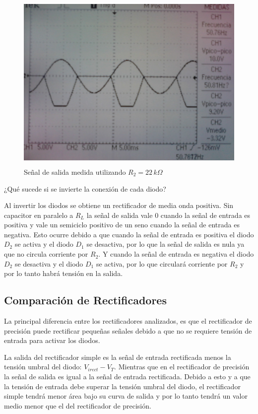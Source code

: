 \documentclass[10pt,spanish,a4paper,openany,notitlepage]{article}
\begin{document}
\begin{figure}[H]
\centering
\includegraphics[width=350pt, height=250pt]{mediciones/F4-22k.jpg}
\caption{Señal de salida medida utilizando $R_2 = 22\,\unit{k\Omega}$}
\label{fig:F4_22k}
\end{figure}


{\color{Orange} ¿Qué sucede si se invierte la conexión de cada diodo?}

Al invertir los diodos se obtiene un rectificador de media onda positiva. Sin capacitor en paralelo a
$R_L$ la señal de salida vale 0 cuando la señal de entrada es positiva y vale un semiciclo positivo de un seno cuando la señal de entrada es negativa. Esto ocurre debido a que cuando la señal de entrada es positiva el diodo $D_2$ se activa y el diodo $D_1$ se desactiva, por lo que la señal de salida es nula ya
que no circula corriente por $R_2$. Y cuando la señal de entrada es negativa el diodo $D_2$ se desactiva y el diodo $D_1$ se activa, por lo que circulará corriente por $R_2$ y por lo tanto habrá tensión en la salida.

\subsection{Comparación de Rectificadores}

La principal diferencia entre los rectificadores analizados, es que el rectificador de precisión puede
rectificar pequeñas señales debido a que no se requiere tensión de entrada para activar los diodos.

La salida del rectificador simple es la señal de entrada rectificada menos la tensión umbral del diodo: $V_{i rect} - V_T$. Mientras que en el rectificador de precisión la señal de salida es igual a la señal de entrada rectificada. Debido a esto y a que la tensión de entrada debe superar la tensión umbral del diodo, el rectificador simple tendrá menor área bajo su curva de salida y por lo tanto tendrá un valor medio menor que el del rectificador de precisión.
\end{document}
